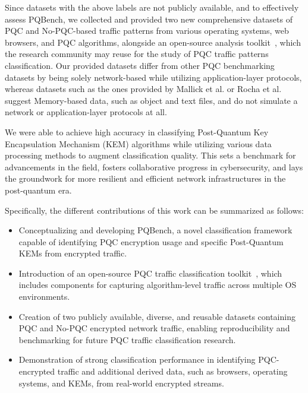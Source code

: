 \documentclass[10pt,journal]{IEEEtran}%
\begin{document}
Since datasets with the above labels are not publicly available, and to effectively assess PQBench, we collected and provided two new comprehensive datasets of PQC and No-PQC-based traffic patterns from various operating systems, web browsers, and PQC algorithms, alongside an open-source analysis toolkit~\cite{PQBench}, which the research community may reuse for the study of PQC traffic patterns classification. Our provided datasets differ from other PQC benchmarking datasets by being solely network-based while utilizing application-layer protocols, whereas datasets such as the ones provided by Mallick et al. \cite{mallick2025fingerprintingimplementationscryptographicprimitives} or Rocha et al. \cite{rocha2022} suggest Memory-based data, such as object and text files, and do not simulate a network or application-layer protocols at all.

We were able to achieve high accuracy in classifying Post-Quantum Key Encapsulation Mechanism (KEM) algorithms while utilizing various data processing methods to augment classification quality. This sets a benchmark for advancements in the field, fosters collaborative progress in cybersecurity, and lays the groundwork for more resilient and efficient network infrastructures in the post-quantum era.

Specifically, the different contributions of this work can be summarized as follows:
\begin{itemize}
    \item Conceptualizing and developing PQBench, a novel classification framework capable of identifying PQC encryption usage and specific Post-Quantum KEMs from encrypted traffic.
    \item Introduction of an open-source PQC traffic classification toolkit~\cite{PQBench}, which includes components for capturing algorithm-level traffic across multiple OS environments.
    \item Creation of two publicly available, diverse, and reusable datasets containing PQC and No-PQC encrypted network traffic, enabling reproducibility and benchmarking for future PQC traffic classification research.
    \item Demonstration of strong classification performance in identifying PQC-encrypted traffic and additional derived data, such as browsers, operating systems, and KEMs, from real-world encrypted streams.
\end{itemize}

\end{document}
